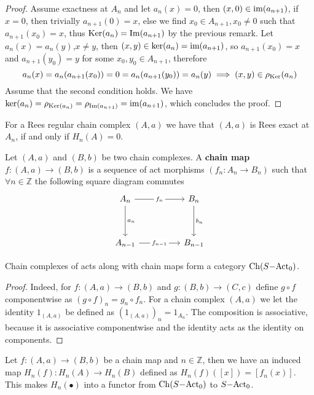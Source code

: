 \begin{proof}[Proof]
    Assume exactness at $A_n$ and let $a_n(x)=0$, then $(x,0)\in\text{im}(a_{n+1})$, if 
    $x=0$, then trivially $a_{n+1}(0)=x$, else we find $x_0\in A_{n+1},x_0\neq 0$ such that $a_{n+1}(x_0)=x$, thus
    $\mathrm{Ker}(a_n)=\mathrm{Im}(a_{n+1})$ by the previous remark. Let $a_n(x)=a_n(y)$,$x\neq y$, then $(x,y)\in\mathrm{ker}(a_n)=\text{im}(a_{n+1})$, 
    so $a_{n+1}(x_0)=x$ and $a_{n+1}(y_0)=y$ for some $x_0,y_0\in A_{n+1}$, therefore 
    \[
        a_n(x)= a_n(a_{n+1}(x_0)) = 0 = a_n(a_{n+1}(y_0)) = a_n(y) \implies (x,y)\in\rho_\mathrm{Ker}(a_n)
    \]
    Assume that the second condition holds. We have $\mathrm{ker}(a_n) = \rho_{\mathrm{Ker}(a_n)} = \rho_{\mathrm{Im}(a_{n+1})} = \text{im}(a_{n+1})$, 
    which concludes the proof.
\end{proof}
\begin{remark}
    For a Rees regular chain complex $(A,a)$ we have that $(A,a)$ is Rees exact at $A_n$, if and only if $H_n(A)=0$.
\end{remark}
\begin{definition}
    Let $(A,a)$ and $(B,b)$ be two chain complexes. A \textbf{chain map} $f:(A,a)\to(B,b)$ is a sequence of act morphisms $(f_n: A_n\to B_n)$ 
    such that $\forall n\in\mathbb{Z}$ the following square diagram commutes
    \[\begin{tikzcd}
        {A_n} && {B_n} \\
        \\
        {A_{n-1}} && {B_{n-1}}
        \arrow["{f_n}"{description}, from=1-1, to=1-3]
        \arrow["{a_n}", from=1-1, to=3-1]
        \arrow["{b_n}", from=1-3, to=3-3]
        \arrow["{f_{n-1}}"{description}, from=3-1, to=3-3]
    \end{tikzcd}\]
\end{definition}
\begin{proposition}
    Chain complexes of acts along with chain maps form a category $\mathrm{Ch}(S\mathrm{-Act}_0)$.
\end{proposition}
\begin{proof}
    Indeed, for $f:(A,a)\to (B,b)$ and $g:(B,b)\to (C,c)$ define $g\circ f$ componentwise as 
    $(g\circ f)_n = g_n \circ f_n$. For a chain complex $(A,a)$ we let the identity $1_{(A,a)}$ 
    be defined as $(1_{(A,a)})_n = 1_{A_n}$. The composition is associative, because it is associative 
    componentwise and the identity acts as the identity on components.
\end{proof}
\begin{proposition}
    Let $f: (A,a) \to (B,b)$ be a chain map and $n\in\mathbb{Z}$, then we have an induced map $H_n(f) : H_n(A) \to H_n(B)$
    defined as $H_n(f)([x]) = [f_n(x)]$. This makes $H_n(\bullet)$ into a functor from $\mathrm{Ch}(S\mathrm{-Act}_0)$ to $S\mathrm{-Act}_0$.
\end{proposition}
